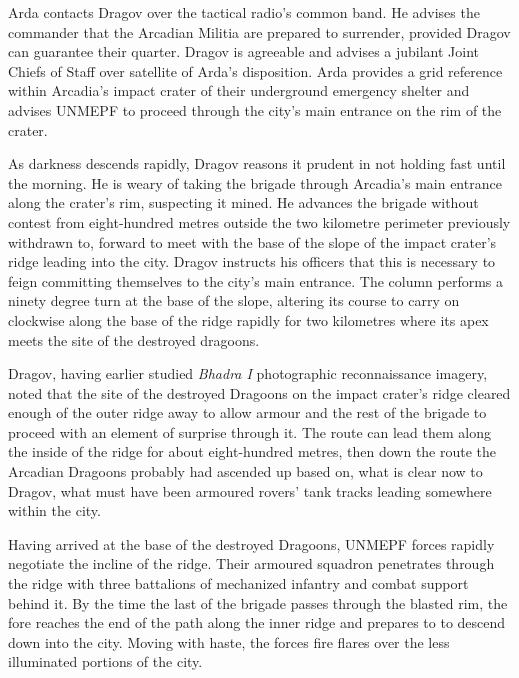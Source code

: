 Arda contacts Dragov over the tactical radio's common band. He advises the commander that the Arcadian Militia are prepared to surrender, provided Dragov can guarantee their quarter. Dragov is agreeable and advises a jubilant Joint Chiefs of Staff over satellite of Arda's disposition. Arda provides a grid reference within Arcadia's impact crater of their underground emergency shelter and advises UNMEPF to proceed through the city's main entrance on the rim of the crater. 

As darkness descends rapidly, Dragov reasons it prudent in not holding fast until the morning. He is weary of taking the brigade through Arcadia's main entrance along the crater's rim, suspecting it mined. He advances the brigade without contest from eight-hundred metres outside the two kilometre perimeter previously withdrawn to, forward to meet with the base of the slope of the impact crater's ridge leading into the city. Dragov instructs his officers that this is necessary to feign committing themselves to the city's main entrance. The column performs a ninety degree turn at the base of the slope, altering its course to carry on clockwise along the base of the ridge rapidly for two kilometres where its apex meets the site of the destroyed dragoons.

Dragov, having earlier studied {\it Bhadra I} photographic reconnaissance imagery, noted that the site of the destroyed Dragoons on the impact crater's ridge cleared enough of the outer ridge away to allow armour and the rest of the brigade to proceed with an element of surprise through it. The route can lead them along the inside of the ridge for about eight-hundred metres, then down the route the Arcadian Dragoons probably had ascended up based on, what is clear now to Dragov, what must have been armoured rovers' tank tracks leading somewhere within the city.

Having arrived at the base of the destroyed Dragoons, UNMEPF forces rapidly negotiate the incline of the ridge. Their armoured squadron penetrates through the ridge with three battalions of mechanized infantry and combat support behind it. By the time the last of the brigade passes through the blasted rim, the fore reaches the end of the path along the inner ridge and prepares to to descend down into the city. Moving with haste, the forces fire flares over the less illuminated portions of the city. 

